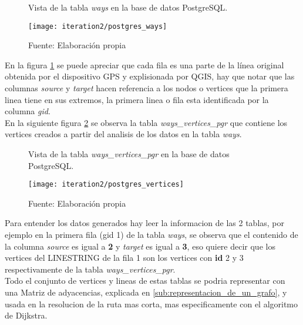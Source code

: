         \begin{figure}[H]
          \begin{center}
            \caption{Vista de la tabla \emph{ways} en la base de datos PostgreSQL.}
            \label{fig:postgres_ways}
            \texttt{[image: iteration2/postgres\_ways]}
            \caption*{Fuente: Elaboración propia}
          \end{center}
        \end{figure}

        En la figura \ref{fig:postgres_ways} se puede apreciar que cada fila es una parte de la línea original obtenida por el dispositivo GPS y explisionada por QGIS, hay que notar que las columnas \emph{source} y \emph{target} hacen referencia a los nodos o vertices que la primera linea tiene en sus extremos, la primera linea o fila esta identificada por la columna \emph{gid}.\\

        En la siguiente figura \ref{fig:postgres_vertices} se observa la tabla \emph{ways\_vertices\_pgr} que contiene los vertices creados a partir del analisis de los datos en la tabla \emph{ways}.

        \begin{figure}[H]
          \begin{center}
            \caption{Vista de la tabla \emph{ways\_vertices\_pgr} en la base de datos PostgreSQL.}
            \label{fig:postgres_vertices}
            \texttt{[image: iteration2/postgres\_vertices]}
            \caption*{Fuente: Elaboración propia}
          \end{center}
        \end{figure}

        Para entender los datos generados hay leer la informacion de las 2 tablas, por ejemplo en la primera  fila (gid 1) de la tabla \emph{ways}, se observa que el contenido de la columna \emph{source} es igual a \textbf{2} y \emph{target} es igual a \textbf{3}, eso quiere decir que los vertices del LINESTRING de la fila 1 son los vertices con \textbf{id} 2 y 3 respectivamente de la tabla \emph{ways\_vertices\_pgr}.\\


        Todo el conjunto de vertices y lineas de estas tablas se podria representar con una Matriz de adyacencias, explicada en \ref{sub:representacion_de_un_grafo}, y usada en la resolucion de la ruta mas corta, mas especificamente con el algoritmo de Dijkstra.\\

